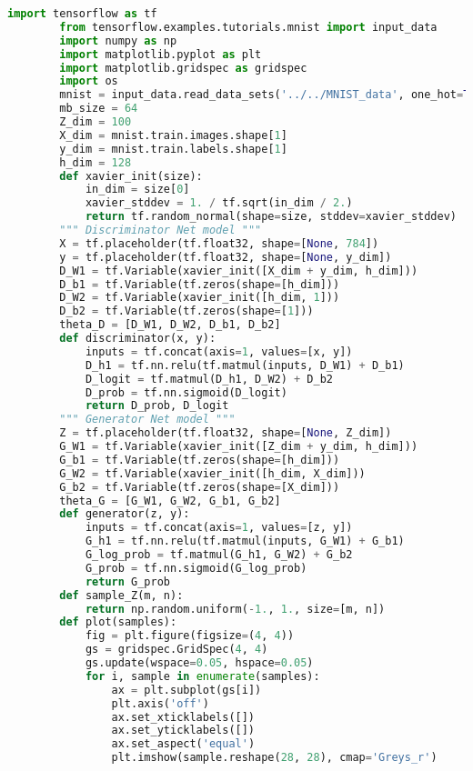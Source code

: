        \begin{lstlisting}[language = Python]
        import tensorflow as tf
        from tensorflow.examples.tutorials.mnist import input_data
        import numpy as np
        import matplotlib.pyplot as plt
        import matplotlib.gridspec as gridspec
        import os
        mnist = input_data.read_data_sets('../../MNIST_data', one_hot=True)
        mb_size = 64
        Z_dim = 100
        X_dim = mnist.train.images.shape[1]
        y_dim = mnist.train.labels.shape[1]
        h_dim = 128
        def xavier_init(size):
            in_dim = size[0]
            xavier_stddev = 1. / tf.sqrt(in_dim / 2.)
            return tf.random_normal(shape=size, stddev=xavier_stddev)
        """ Discriminator Net model """
        X = tf.placeholder(tf.float32, shape=[None, 784])
        y = tf.placeholder(tf.float32, shape=[None, y_dim])
        D_W1 = tf.Variable(xavier_init([X_dim + y_dim, h_dim]))
        D_b1 = tf.Variable(tf.zeros(shape=[h_dim]))
        D_W2 = tf.Variable(xavier_init([h_dim, 1]))
        D_b2 = tf.Variable(tf.zeros(shape=[1]))
        theta_D = [D_W1, D_W2, D_b1, D_b2]
        def discriminator(x, y):
            inputs = tf.concat(axis=1, values=[x, y])
            D_h1 = tf.nn.relu(tf.matmul(inputs, D_W1) + D_b1)
            D_logit = tf.matmul(D_h1, D_W2) + D_b2
            D_prob = tf.nn.sigmoid(D_logit)
            return D_prob, D_logit
        """ Generator Net model """
        Z = tf.placeholder(tf.float32, shape=[None, Z_dim])
        G_W1 = tf.Variable(xavier_init([Z_dim + y_dim, h_dim]))
        G_b1 = tf.Variable(tf.zeros(shape=[h_dim]))
        G_W2 = tf.Variable(xavier_init([h_dim, X_dim]))
        G_b2 = tf.Variable(tf.zeros(shape=[X_dim]))
        theta_G = [G_W1, G_W2, G_b1, G_b2]
        def generator(z, y):
            inputs = tf.concat(axis=1, values=[z, y])
            G_h1 = tf.nn.relu(tf.matmul(inputs, G_W1) + G_b1)
            G_log_prob = tf.matmul(G_h1, G_W2) + G_b2
            G_prob = tf.nn.sigmoid(G_log_prob)
            return G_prob
        def sample_Z(m, n):
            return np.random.uniform(-1., 1., size=[m, n])
        def plot(samples):
            fig = plt.figure(figsize=(4, 4))
            gs = gridspec.GridSpec(4, 4)
            gs.update(wspace=0.05, hspace=0.05)
            for i, sample in enumerate(samples):
                ax = plt.subplot(gs[i])
                plt.axis('off')
                ax.set_xticklabels([])
                ax.set_yticklabels([])
                ax.set_aspect('equal')
                plt.imshow(sample.reshape(28, 28), cmap='Greys_r')

\end{lstlisting}

